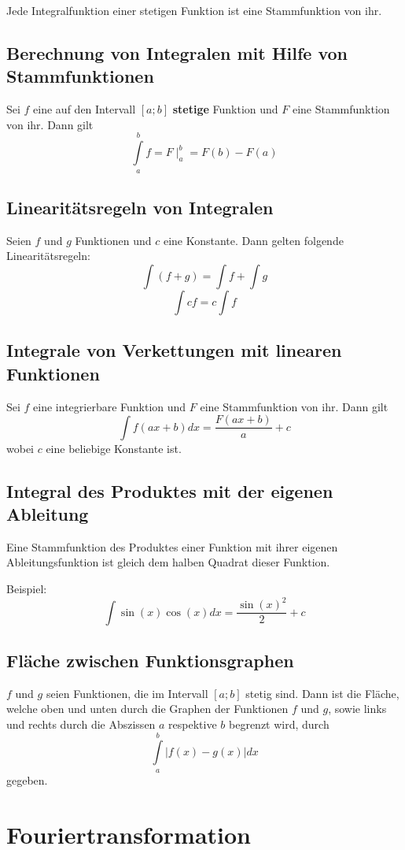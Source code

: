\documentclass[10pt,a4paper]{scrartcl}
\begin{document}
Jede Integralfunktion einer stetigen Funktion ist eine Stammfunktion von ihr.


\subsection{Berechnung von Integralen mit Hilfe von Stammfunktionen}

Sei $f$ eine auf den Intervall $[a;b]$ \textbf{stetige} Funktion und $F$ eine
Stammfunktion von ihr. Dann gilt
$$\int\limits_a^b f = F\mid_a^b = F(b) - F(a)$$


\subsection{Linearitätsregeln von Integralen}

Seien $f$ und $g$ Funktionen und $c$ eine Konstante. Dann gelten folgende
Linearitätsregeln:
$$\int (f+g) = \int f + \int g$$
$$\int cf = c \int f$$


\subsection{Integrale von Verkettungen mit linearen Funktionen}
Sei $f$ eine integrierbare Funktion und $F$ eine Stammfunktion von ihr. Dann
gilt
$$\int f(ax+b)dx = \frac{F(ax+b)}{a} + c$$
wobei $c$ eine beliebige Konstante ist.


\subsection{Integral des Produktes mit der eigenen Ableitung} 
Eine Stammfunktion des Produktes einer Funktion mit ihrer eigenen
Ableitungsfunktion ist gleich dem halben Quadrat dieser Funktion.

Beispiel:
$$\int \sin(x) \cos(x) dx = \frac{\sin(x)^2}{2} + c$$


\subsection{Fläche zwischen Funktionsgraphen} 

$f$ und $g$ seien Funktionen, die im Intervall $[a;b]$ stetig sind. Dann ist
die Fläche, welche oben und unten durch die Graphen der Funktionen $f$ und $g$,
sowie links und rechts durch die Abszissen $a$ respektive $b$ begrenzt wird,
durch
$$\int\limits_a^b |f(x) - g(x)| dx$$
gegeben.


\section{Fouriertransformation}
\end{document}
